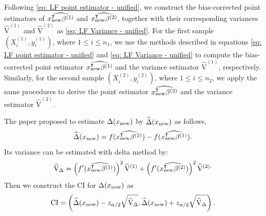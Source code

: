 Following \eqref{eq: LF point estimator - unified}, we construct the bias-corrected point estimators of $\widehat{x_{\rm new}^\intercal \beta^{(1)}}$ and $\widehat{x_{\rm new}^\intercal \beta^{(2)}}$, together with their corresponding variances $\widehat{\mathrm{V}}^{(1)}$ and $\widehat{\mathrm{V}}^{(2)}$ as \eqref{eq: LF Variance - unified}. 
For the first sample $(X_i^{(1)}, y_i^{(1)})$, where $1 \leq i \leq n_1$, we use the methods described in equations \eqref{eq: LF point estimator - unified} and \eqref{eq: LF Variance - unified} to compute the bias-corrected point estimator $\widehat{x_{\rm new}^\intercal \beta^{(1)}}$ and the variance estimator $\widehat{\mathrm{V}}^{(1)}$, respectively. Similarly, for the second sample $(X_i^{(2)}, y_i^{(2)})$, where $1 \leq i \leq n_2$, we apply the same procedures to derive the point estimator $\widehat{x_{\rm new}^\intercal \beta^{(2)}}$ and the variance estimator $\widehat{\mathrm{V}}^{(2)}$.

The paper \citet{cai2021optimal} proposed to estimate $\Delta(x_{\rm new})$ by $\widehat{\Delta}(x_{\rm new})$ as follows,
\begin{equation*}
    \widehat{\Delta}(x_{\rm new}) = f(\widehat{x_{\rm new}^\intercal \beta^{(2)}}) - f(\widehat{x_{\rm new}^\intercal \beta^{(1)}}).
\end{equation*}
Its variance can be estimated with delta method by:
\begin{equation*}
    \widehat{\mathrm{V}}_\Delta = \left(f^\prime(\widehat{x_{\rm new}^\intercal \beta^{(1)}})\right)^2  \widehat{\mathrm{V}}^{(1)} + \left(f^\prime(\widehat{x_{\rm new}^\intercal \beta^{(2)}})\right)^2  \widehat{\mathrm{V}}^{(2).}
\end{equation*}
{ Then we construct the CI for $\Delta(x_{\rm new})$ as
 $${\rm CI} = \left(\widehat{\Delta}(x_{\rm new}) - z_{\alpha/2}\sqrt{\widehat{\rm V}_{\Delta}}, \widehat{\Delta}(x_{\rm new}) + z_{\alpha/2}\sqrt{\widehat{\rm V}_{\Delta}}\right).$$
 }


